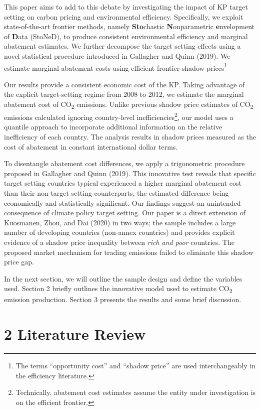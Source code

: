 \documentclass[
  10pt,
]{article}
\begin{document}
This paper aims to add to this debate by investigating the impact of KP
target setting on carbon pricing and environmental efficiency.
Specifically, we exploit state-of-the-art frontier methods, namely
\textbf{Sto}chastic \textbf{N}onparametric \textbf{e}nvelopment of
\textbf{D}ata (StoNeD), to produce consistent environmental efficiency
and marginal abatement estimates. We further decompose the target
setting effects using a novel statistical procedure introduced in
Gallagher and Quinn (2019). We estimate marginal abatement costs using
efficient frontier shadow prices\footnote{The terms ``opportunity cost''
  and ``shadow price'' are used interchangeably in the efficiency
  literature.}

Our results provide a consistent economic cost of the KP. Taking
advantage of the explicit target-setting regime from 2008 to 2012, we
estimate the marginal abatement cost of CO\textsubscript{2} emissions.
Unlike previous shadow price estimates of CO\textsubscript{2} emissions
calculated ignoring country-level inefficiencies\footnote{Technically,
  abatement cost estimates assume the entity under investigation is on
  the efficient frontier.}, our model uses a quantile approach to
incorporate additional information on the relative inefficiency of each
country. The analysis results in shadow prices measured as the cost of
abatement in constant international dollar terms.

To disentangle abatement cost differences, we apply a trigonometric
procedure proposed in Gallagher and Quinn (2019). This innovative test
reveals that specific target setting countries typical experienced a
higher marginal abatement cost than their non-target setting
counterparts, the estimated difference being economically and
statistically significant. Our findings suggest an unintended
consequence of climate policy target setting. Our paper is a direct
extension of Kuosmanen, Zhou, and Dai (2020) in two ways; the sample
includes a large number of developing countries (non-annex countries)
and provides explicit evidence of a shadow price inequality between
\emph{rich and poor} countries. The proposed market mechanism for
trading emissions failed to eliminate this shadow price gap.

In the next section, we will outline the sample design and define the
variables used. Section 2 briefly outlines the innovative model used to
estimate CO\textsubscript{2} emission production. Section 3 presents the
results and some brief discussion.

\hypertarget{literature-review}{%
\section{2 Literature Review}\label{literature-review}}
\end{document}
